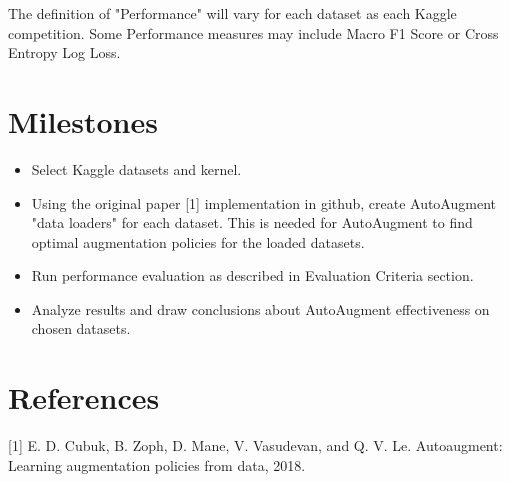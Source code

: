 \documentclass[10pt,twocolumn,letterpaper]{article}
\begin{document}
The definition of "Performance" will vary for each dataset as each Kaggle competition.  Some Performance measures may include Macro F1 Score or Cross Entropy Log Loss.

\section{Milestones}

\begin{itemize}
  \item Select Kaggle datasets and kernel. 
  \item Using the original paper [1] implementation in github, create AutoAugment "data loaders" for each dataset.  This is needed for AutoAugment to find optimal augmentation policies for the loaded datasets.
  \item Run performance evaluation as described in Evaluation Criteria section.
  \item Analyze results and draw conclusions about AutoAugment effectiveness on chosen datasets.
  
\end{itemize}

\section{References}

[1]  E. D. Cubuk, B. Zoph, D. Mane, V. Vasudevan, and Q. V. Le. Autoaugment:   Learning  augmentation  policies  from  data, 2018. \newline


{\small


}
\end{document}
